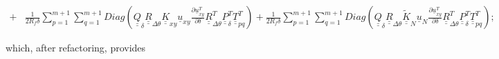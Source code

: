 \begin{equation}
\begin{split}
+&\frac{1}{2R_{f}\delta}\sum_{p=1}^{m+1}\sum_{q=1}^{m+1}Diag\left(\underline{\underline{Q}}_{\delta}\underline{\underline{R}}_{\Delta\theta}\underline{\underline{K}}_{xy}\underline{u}_{xy}\frac{\partial \underline{u}_{xy}^{T}}{\partial \delta}\underline{\underline{R}}_{\Delta\theta}^{T}\underline{\underline{P}}_{\delta}^{T}\underline{\underline{T}}_{pq}^{T}\right)+\frac{1}{2R_{f}\delta}\sum_{p=1}^{m+1}\sum_{q=1}^{m+1}Diag\left(\underline{\underline{Q}}_{\delta}\underline{\underline{R}}_{\Delta\theta}\underline{\underline{\widetilde{K}}}_{N}\underline{u}_{N}\frac{\partial \underline{u}_{xy}^{T}}{\partial \delta}\underline{\underline{R}}_{\Delta\theta}^{T}\underline{\underline{P}}_{\delta}^{T}\underline{\underline{T}}_{pq}^{T}\right);
\end{split}
\end{equation}

which, after refactoring, provides

